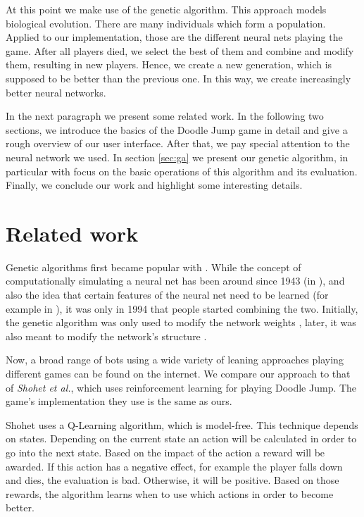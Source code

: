 \documentclass[a4paper,12pt,pagesize,headsepline,bibtotoc,titlepage,abstracton]{scrartcl}
\begin{document}
At this point we make use of the genetic algorithm. This approach models biological evolution. There are many individuals which form a population. Applied to our implementation, those are the different neural nets playing the game. After all players died, we select the best of them and combine and modify them, resulting in new players. Hence, we create a new generation, which is supposed to be better than the previous one. In this way, we create increasingly better neural networks.

In the next paragraph we present some related work. In the following two sections, we introduce the basics of the Doodle Jump game in detail and give a rough overview of our user interface. After that, we pay special attention to the neural network we used. In section \ref{sec:ga} we present our genetic algorithm, in particular with focus on the basic operations of this algorithm and its evaluation. Finally, we conclude our work and highlight some interesting details.


\section{Related work}
\label{sec:rw}

Genetic algorithms first became popular with \cite{Holland:1975:ANA:531075}. While the concept of computationally simulating a neural net has been around since 1943 (in \cite{McCulloch1943}), and also the idea that certain features of the neural net need to be learned (for example in \cite{Rosenblatt58theperceptron:}), it was only in 1994 that people started combining the two. Initially, the genetic algorithm was only used to modify the network weights \cite{DBLP:conf/ppsn/RonaldS94}, later, it was also meant to modify the network's structure \cite{Stanley:2002:ENN:638553.638554}.

Now, a broad range of bots using a wide variety of leaning approaches playing different games can be found on the internet. We compare our approach to that of \textit{Shohet et al.}\cite{eshohet}, which uses reinforcement learning for playing Doodle Jump. The game's implementation they use is the same as ours.

Shohet uses a Q-Learning algorithm, which is model-free. This technique depends on states. Depending on the current state an action will be calculated in order to go into the next state. Based on the impact of the action a reward will be awarded. If this action has a negative effect, for example the player falls down and dies, the evaluation is bad. Otherwise, it will be positive. Based on those rewards, the algorithm learns when to use which actions in order to become better.
\end{document}
